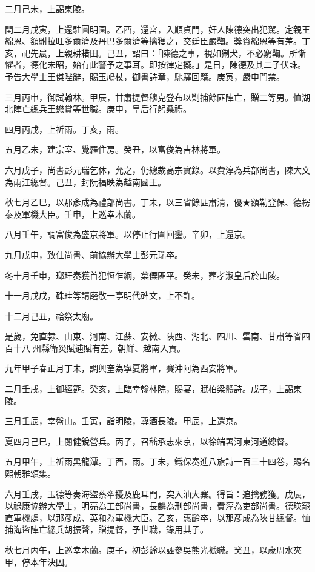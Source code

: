 \begin{pinyinscope}
二月己未，上謁東陵。

閏二月戊寅，上還駐圓明園。乙酉，還宮，入順貞門，奸人陳德突出犯駕。定親王綿恩、額駙拉旺多爾濟及丹巴多爾濟等擒獲之，交廷臣嚴鞫。獎賚綿恩等有差。丁亥，祀先農，上親耕耤田。己丑，詔曰：「陳德之事，視如猘犬，不必窮鞫。所慚懼者，德化未昭，始有此警予之事耳。即按律定擬。」是日，陳德及其二子伏誅。予告大學士王傑陛辭，賜玉鳩杖，御書詩章，馳驛回籍。庚寅，嚴申門禁。

三月丙申，御試翰林。甲辰，甘肅提督穆克登布以剿捕餘匪陣亡，贈二等男。恤湖北陣亡總兵王懋賞等世職。庚申，皇后行躬桑禮。

四月丙戌，上祈雨。丁亥，雨。

五月乙未，建宗室、覺羅住房。癸丑，以富俊為吉林將軍。

六月戊子，尚書彭元瑞乞休，允之，仍總裁高宗實錄。以費淳為兵部尚書，陳大文為兩江總督。己丑，封阮福映為越南國王。

秋七月乙巳，以那彥成為禮部尚書。丁未，以三省餘匪肅清，優★額勒登保、德楞泰及軍機大臣。壬申，上巡幸木蘭。

八月壬午，調富俊為盛京將軍。以停止行圍回鑾。辛卯，上還京。

九月戊申，致仕尚書、前協辦大學士彭元瑞卒。

冬十月壬申，瑯玕奏獲首犯恆乍綱，枲僳匪平。癸未，葬孝淑皇后於山陵。

十一月戊戌，硃珪等請磨敬一亭明代碑文，上不許。

十二月己丑，祫祭太廟。

是歲，免直隸、山東、河南、江蘇、安徽、陜西、湖北、四川、雲南、甘肅等省四百十八州縣衛災賦逋賦有差。朝鮮、越南入貢。

九年甲子春正月丁未，調興奎為寧夏將軍，賽沖阿為西安將軍。

二月壬戌，上御經筵。癸亥，上臨幸翰林院，賜宴，賦柏梁體詩。戊子，上謁東陵。

三月壬辰，幸盤山。壬寅，詣明陵，尊酒長陵。甲辰，上還京。

夏四月己巳，上閱健銳營兵。丙子，召嵇承志來京，以徐端署河東河道總督。

五月甲午，上祈雨黑龍潭。丁酉，雨。丁未，鐵保奏進八旗詩一百三十四卷，賜名熙朝雅頌集。

六月壬戌，玉德等奏海盜蔡牽擾及鹿耳門，突入汕大寨。得旨：追擒務獲。戊辰，以祿康協辦大學士，明亮為工部尚書，長麟為刑部尚書，費淳為吏部尚書。德瑛罷直軍機處，以那彥成、英和為軍機大臣。乙亥，惠齡卒，以那彥成為陜甘總督。恤捕海盜陣亡總兵胡振聲，贈提督，予世職，錄用其子。

秋七月丙午，上巡幸木蘭。庚子，初彭齡以誣參吳熊光褫職。癸丑，以歲周水夾甲，停本年決囚。


\end{pinyinscope}
